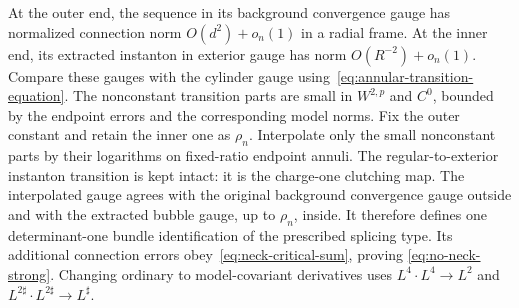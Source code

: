 \documentclass[11pt]{amsart}
\theoremstyle{definition}
\theoremstyle{remark}
\theoremstyle{plain}
\begin{document}
At the outer end, the sequence in its background convergence gauge
has normalized connection norm $O(d^2)+o_n(1)$ in a radial frame.
At the inner end, its extracted instanton in exterior gauge has norm
$O(R^{-2})+o_n(1)$.  Compare these gauges with the cylinder gauge
using~\eqref{eq:annular-transition-equation}.  The nonconstant
transition parts are small in $W^{2,p}$ and $C^0$, bounded by the
endpoint errors and the corresponding model norms.  Fix the outer
constant and retain the inner one as $\rho_n$.  Interpolate only
the small nonconstant parts by their logarithms on fixed-ratio
endpoint annuli.  The regular-to-exterior instanton transition is
kept intact: it is the charge-one clutching map.  The interpolated
gauge agrees with the original background convergence gauge outside
and with the extracted bubble gauge, up to $\rho_n$, inside.
It therefore defines one determinant-one bundle identification of
the prescribed splicing type.  Its additional connection errors
obey~\eqref{eq:neck-critical-sum}, proving
\eqref{eq:no-neck-strong}.  Changing ordinary to model-covariant
derivatives uses $L^4\cdot L^4\to L^2$ and
$L^{2\sharp}\cdot L^{2\sharp}\to L^\sharp$.
\end{document}
